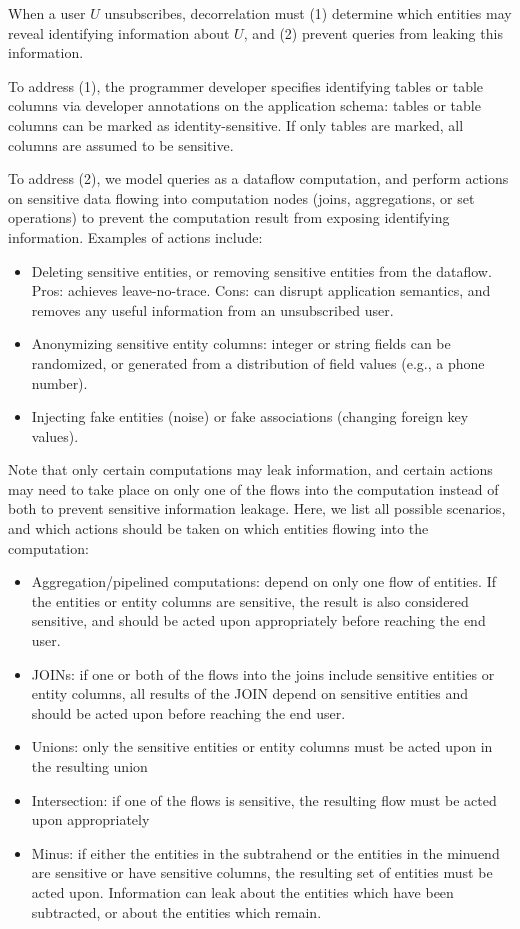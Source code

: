 When a user $U$ unsubscribes, decorrelation must (1) determine which entities may reveal identifying
information about $U$, and (2) prevent queries from leaking this information.

To address (1), the programmer developer specifies identifying tables or table columns 
via developer annotations on
the application schema: tables or table columns can be marked as identity-sensitive. If only tables
are marked, all columns are assumed to be sensitive.

To address (2), we model queries as a dataflow computation, and perform actions on sensitive
data flowing into computation nodes (joins, aggregations, or set operations) to prevent the
computation result from exposing identifying information.
Examples of actions include:
\begin{itemize}
    \item Deleting sensitive entities, or removing sensitive entities from the dataflow. Pros:
        achieves leave-no-trace. Cons: can disrupt application semantics, and removes any useful
        information from an unsubscribed user. 
    \item Anonymizing sensitive entity columns: integer or string fields can be randomized, or
        generated from a distribution of field values (e.g., a phone number). 
    \item Injecting fake entities (noise) or fake associations (changing foreign key values).
\end{itemize}

Note that only certain computations may leak information, and certain actions may need to take place
on only one of the flows into the computation instead of both to prevent sensitive information
leakage.  Here, we list all possible scenarios, and which actions should be taken on which entities
flowing into the computation: 
\begin{itemize}
    \item Aggregation/pipelined computations: depend on only one flow of entities. If the entities
        or entity columns are sensitive, the result is also considered sensitive, and should be acted upon
        appropriately before reaching the end user.
    \item JOINs: if one or both of the flows into the joins include sensitive entities or entity
    columns, all results of the JOIN depend on sensitive entities and should be acted upon before
reaching the end user.  
    \item Unions: only the sensitive entities or entity columns must be acted upon in
    the resulting union
    \item Intersection: if one of the flows is sensitive, the resulting flow must be acted upon
        appropriately 
    \item Minus: if either the entities in the subtrahend or the entities in the minuend are
        sensitive or have sensitive columns, the resulting set of entities must be acted upon.
        Information can leak about the entities which have been subtracted, or about the entities
        which remain.
\end{itemize}

